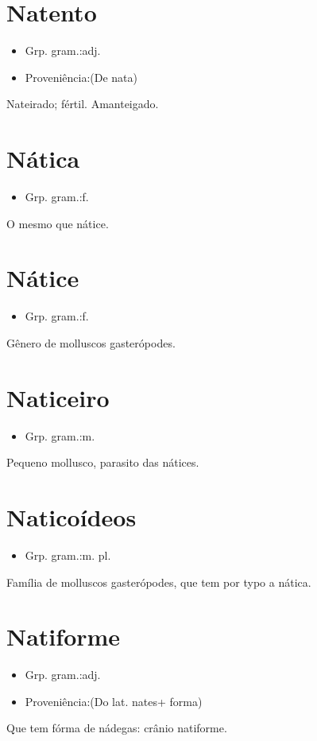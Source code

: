 \section{Natento}
\begin{itemize}
\item {Grp. gram.:adj.}
\end{itemize}
\begin{itemize}
\item {Proveniência:(De \textunderscore nata\textunderscore )}
\end{itemize}
Nateirado; fértil.
Amanteigado.
\section{Nática}
\begin{itemize}
\item {Grp. gram.:f.}
\end{itemize}
O mesmo que \textunderscore nátice\textunderscore .
\section{Nátice}
\begin{itemize}
\item {Grp. gram.:f.}
\end{itemize}
Gênero de molluscos gasterópodes.
\section{Naticeiro}
\begin{itemize}
\item {Grp. gram.:m.}
\end{itemize}
Pequeno mollusco, parasito das nátices.
\section{Naticoídeos}
\begin{itemize}
\item {Grp. gram.:m. pl.}
\end{itemize}
Família de molluscos gasterópodes, que tem por typo a nática.
\section{Natiforme}
\begin{itemize}
\item {Grp. gram.:adj.}
\end{itemize}
\begin{itemize}
\item {Proveniência:(Do lat. \textunderscore nates\textunderscore  + \textunderscore forma\textunderscore )}
\end{itemize}
Que tem fórma de nádegas: \textunderscore crânio natiforme\textunderscore .
